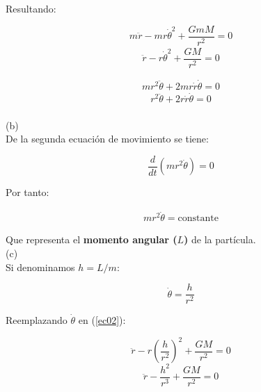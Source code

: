 \documentclass[letter,11pt]{article}
\begin{document}
Resultando:

\begin{equation*}
    m\ddot{r}-mr\dot{\theta}^2+\frac{GmM}{r^2}=0
\end{equation*}
\begin{equation}
\boxed{\begin{array}{l}
    \ddot{r}-r\dot{\theta}^2+\dfrac{GM}{r^2}=0
\end{array}}
\label{ec02}
\end{equation}

\begin{equation*}
    mr^2\ddot{\theta}+2mr\dot{r}\dot{\theta}=0
\end{equation*}
\begin{equation}
\boxed{\begin{array}{l}
    r^2\ddot{\theta}+2r\dot{r}\dot{\theta}=0
\end{array}}
\label{ec03}
\end{equation}
\\

(b) \\

De la segunda ecuación de movimiento se tiene:

\begin{equation}
    \frac{d}{dt}(mr^2\dot{\theta})=0
    \label{ec04}
\end{equation}

Por tanto:

\begin{equation*}
\boxed{\begin{array}{l}
    mr^2\dot{\theta}=\text{constante}
\end{array}}
\end{equation*}

Que representa el \textbf{momento angular ($L$)} de la partícula.
\\

(c) \\

Si denominamos $h=L/m$:

\begin{equation}
    \dot{\theta}=\frac{h}{r^2}
    \label{ec05}
\end{equation}

Reemplazando $\dot{\theta}$ en (\ref{ec02}):

\begin{equation*}
    \ddot{r}-r{\left(\frac{h}{r^2}\right)}^2+\frac{GM}{r^2}=0
\end{equation*}
\begin{equation}
    \ddot{r}-\frac{h^2}{r^3}+\frac{GM}{r^2}=0
    \label{ec06}
\end{equation}
\\
\end{document}
